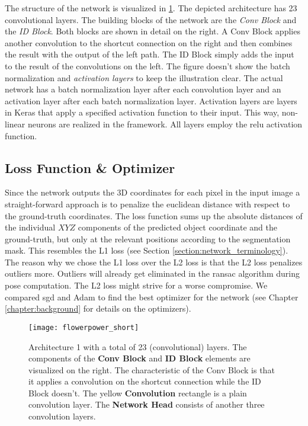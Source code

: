 The structure of the network is visualized in \fig \ref{fig:network_architecture}. The depicted architecture has 23 convolutional layers. The building blocks of the network are the \textit{Conv Block} and the \textit{ID Block}. Both blocks are shown in detail on the right. A Conv Block applies another convolution to the shortcut connection on the right and then combines the result with the output of the left path. The ID Block simply adds the input to the result of the convolutions on the left. The figure doesn't show the batch normalization and \textit{activation layers} to keep the illustration clear. The actual network has a batch normalization layer after each convolution layer and an activation layer after each batch normalization layer. Activation layers are layers in Keras that apply a specified activation function to their input. This way, non-linear neurons are realized in the framework. All layers employ the \ac{relu} activation function.

\subsection{Loss Function \& Optimizer}


Since the network outputs the 3D coordinates for each pixel in the input image a straight-forward approach is to penalize the euclidean distance with respect to the ground-truth coordinates. The loss function sums up the absolute distances of the individual $XYZ$ components of the predicted object coordinate and the ground-truth, but only at the relevant positions according to the segmentation mask. This resembles the L1 loss (see Section \ref{section:network_terminology}). The reason why we chose the L1 loss over the L2 loss is that the L2 loss penalizes outliers more. Outliers will already get eliminated in the \ac{ransac} algorithm during pose computation. The L2 loss might strive for a worse compromise. We compared \ac{sgd} and Adam to find the best optimizer for the network (see Chapter \ref{chapter:background} for details on the optimizers).

\begin{figure}[!tbp]
	\centering
    \texttt{[image: flowerpower\_short]}
    \caption{Architecture 1 with a total of 23 (convolutional) layers. The components of the \textbf{Conv Block} and \textbf{ID Block} elements are visualized on the right. The characteristic of the Conv Block is that it applies a convolution on the shortcut connection while the ID Block doesn't. The yellow \textbf{Convolution} rectangle is a plain convolution layer. The \textbf{Network Head} consists of another three convolution layers.}
    	\label{fig:network_architecture}
\end{figure}

